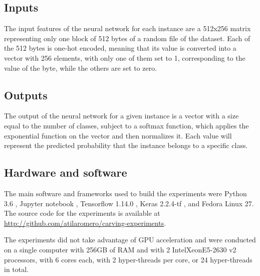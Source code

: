 \subsection{Inputs}
The input features of the neural network for each instance are a 512x256 matrix representing only one block of 512 bytes of a random file of the dataset. Each of the 512 bytes is one-hot encoded, meaning that its value is converted into a vector with 256 elements, with only one of them set to 1, corresponding to the value of the byte, while the others are set to zero.

\subsection{Outputs}
The output of the neural network for a given instance is a vector with a size equal to the number of classes, subject to a softmax function, which applies the exponential function on the vector and then normalizes it. Each value will represent the predicted probability that the instance belongs to a specific class.

\subsection{Hardware and software}
The main software and frameworks used to build the experiments were Python 3.6 
\cite{rossum_python_2019}, Jupyter notebook \cite{perez_jupyter_2019}, Tensorflow 1.14.0 \cite{google_brain_tensorflow_2019}, Keras 2.2.4-tf \cite{chollet_keras_2019}, and Fedora Linux 27.
The source code for the experiments is available at \sloppy\url{http://github.com/atilaromero/carving-experiments}.

The experiments did not take advantage of GPU acceleration and were  conducted on a single computer with 256GB of RAM and with 2 Intel\textregistered Xeon\textregistered E5-2630 v2 processors, with 6 cores each, with 2 hyper-threads per core, or 24 hyper-threads in total. 

